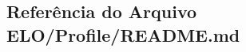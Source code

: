 \hypertarget{ELO_2Profile_2README_8md}{}\subsection{Referência do Arquivo E\+L\+O/\+Profile/\+R\+E\+A\+D\+M\+E.md}
\label{ELO_2Profile_2README_8md}
